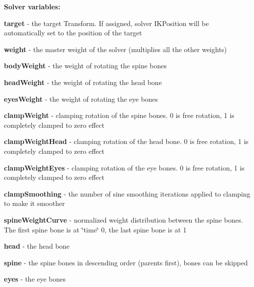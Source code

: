 {\bfseries Solver variables\+:}
\begin{DoxyItemize}
\item {\bfseries target} -\/ the target Transform. If assigned, solver I\+K\+Position will be automatically set to the position of the target
\item {\bfseries weight} -\/ the master weight of the solver (multiplies all the other weights)
\item {\bfseries body\+Weight} -\/ the weight of rotating the spine bones
\item {\bfseries head\+Weight} -\/ the weight of rotating the head bone
\item {\bfseries eyes\+Weight} -\/ the weight of rotating the eye bones
\item {\bfseries clamp\+Weight} -\/ clamping rotation of the spine bones. 0 is free rotation, 1 is completely clamped to zero effect
\item {\bfseries clamp\+Weight\+Head} -\/ clamping rotation of the head bone. 0 is free rotation, 1 is completely clamped to zero effect
\item {\bfseries clamp\+Weight\+Eyes} -\/ clamping rotation of the eye bones. 0 is free rotation, 1 is completely clamped to zero effect
\item {\bfseries clamp\+Smoothing} -\/ the number of sine smoothing iterations applied to clamping to make it smoother
\item {\bfseries spine\+Weight\+Curve} -\/ normalized weight distribution between the spine bones. The first spine bone is at \char`\"{}time\char`\"{} 0, the last spine bone is at 1
\item {\bfseries head} -\/ the head bone
\item {\bfseries spine} -\/ the spine bones in descending order (parents first), bones can be skipped
\item {\bfseries eyes} -\/ the eye bones
\end{DoxyItemize}

 